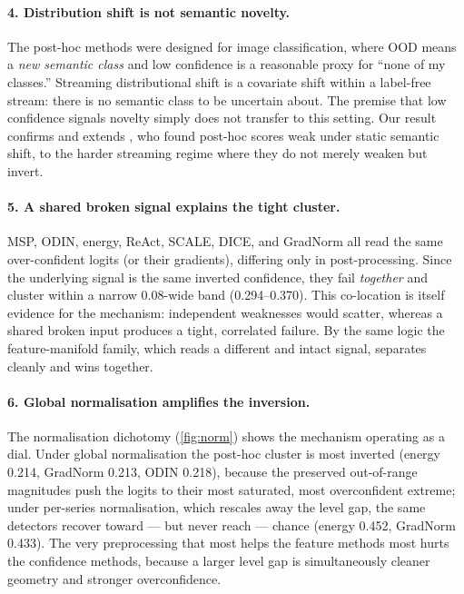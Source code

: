 \paragraph{4. Distribution shift is not semantic novelty.}
The post-hoc methods were designed for image classification, where OOD means a
\emph{new semantic class} and low confidence is a reasonable proxy for ``none of my
classes.'' Streaming distributional shift is a covariate shift within a
label-free stream: there is no semantic class to be uncertain about. The premise
that low confidence signals novelty simply does not transfer to this setting. Our
result confirms and extends \citet{Gungor2025}, who found post-hoc scores weak
under static semantic shift, to the harder streaming regime where they do not merely
weaken but invert.

\paragraph{5. A shared broken signal explains the tight cluster.}
MSP, ODIN, energy, ReAct, SCALE, DICE, and GradNorm all read the same
over-confident logits (or their gradients), differing only in post-processing. Since
the underlying signal is the same inverted confidence, they fail \emph{together} and
cluster within a narrow \num{0.08}-wide band (\numrange{0.294}{0.370}). This
co-location is itself evidence for the mechanism: independent weaknesses would
scatter, whereas a shared broken input produces a tight, correlated failure. By the
same logic the feature-manifold family, which reads a different and intact signal,
separates cleanly and wins together.

\paragraph{6. Global normalisation amplifies the inversion.}
The normalisation dichotomy (\cref{fig:norm}) shows the mechanism operating as a
dial. Under global normalisation the post-hoc cluster is most inverted (energy
\num{0.214}, GradNorm \num{0.213}, ODIN \num{0.218}), because the preserved
out-of-range magnitudes push the logits to their most saturated, most overconfident
extreme; under per-series normalisation, which rescales away the level gap, the same
detectors recover toward --- but never reach --- chance (energy \num{0.452},
GradNorm \num{0.433}). The very preprocessing that most helps the feature methods
most hurts the confidence methods, because a larger level gap is simultaneously
cleaner geometry and stronger overconfidence.

